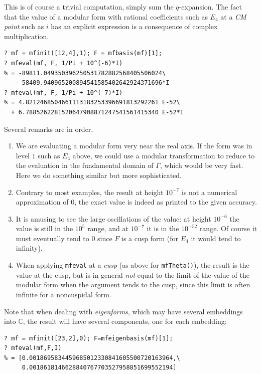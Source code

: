 \documentclass[11pt]{article}
\newcommand{\C}{{\mathbb C}}
\newcommand{\G}{\Gamma}
\def\kbd#1{{\tt #1}}
\begin{document}
This is of course a trivial computation, simply sum the $q$-expansion. The
fact that the value of a modular form with rational coefficients such as
$E_4$ at a \emph{CM point} such as $i$ has an explicit expression is a
consequence of complex multiplication.

\begin{verbatim}
? mf = mfinit([12,4],1); F = mfbasis(mf)[1];
? mfeval(mf, F, 1/Pi + 10^(-6)*I)
% = -89811.049350396250531782882568405506024\
   - 58409.940965200894541585402642924371696*I
? mfeval(mf, F, 1/Pi + 10^(-7)*I)
% = 4.8212468504661113183253396691813292261 E-52\
  + 6.7885262281520647908871247541561415340 E-52*I
\end{verbatim}

Several remarks are in order.

\begin{enumerate}
\item We are evaluating a modular form very near the
  real axis. If the form was in level $1$ such as $E_4$ above, we could use a
  modular transformation to reduce to the evaluation in the fundamental domain
  of $\G$, which would be very fast. Here we do something similar but
  more sophisticated.
\item Contrary to most examples, the result at height $10^{-7}$ is not a
  numerical approximation of $0$, the exact value is indeed as printed to
  the given accuracy.
\item It is amusing to see the large oscillations of the value: at height
  $10^{-6}$ the value is still in the $10^5$ range, and at $10^{-7}$ it is
  in the $10^{-52}$ range. Of course it must eventually tend to $0$ since
  $F$ is a cusp form (for $E_4$ it would tend to infinity).
\item When applying \kbd{mfeval} at a \emph{cusp} (as above for
  \kbd{mfTheta()}), the result is
  the value at the cusp, but is in general \emph{not} equal
  to the limit of the value of the modular form when the argument tends to
  the cusp, since this limit is often infinite for a noncuspidal form.
\end{enumerate}

Note that when dealing with \emph{eigenforms}, which may have several
embeddings into $\C$, the result will have several components, one for each
embedding:

\begin{verbatim}
? mf = mfinit([23,2],0); F=mfeigenbasis(mf)[1];
? mfeval(mf,F,I)
% = [0.0018695834459685012330841605500720163964,\
     0.0018618146628840767703527958851699552194]
\end{verbatim}
\end{document}
